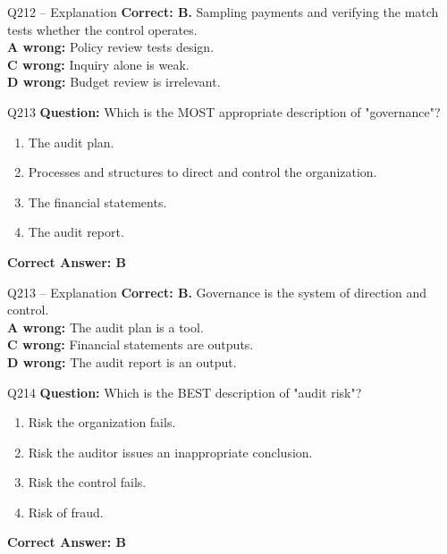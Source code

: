 \documentclass[aspectratio=169,10pt]{beamer}
\begin{document}
	\begin{frame}[t]{Q212 -- Explanation}
		\small
		\textbf{Correct: B.} Sampling payments and verifying the match tests whether the control operates. \\[4pt]
		\textbf{A wrong:} Policy review tests design. \\[2pt]
		\textbf{C wrong:} Inquiry alone is weak. \\[2pt]
		\textbf{D wrong:} Budget review is irrelevant.
	\end{frame}
	
	\begin{frame}[t]{Q213}
		\small
		\textbf{Question:} Which is the MOST appropriate description of "governance"?
		\begin{enumerate}[label=\Alph*.,itemsep=1pt,topsep=2pt]
			\item The audit plan.
			\item Processes and structures to direct and control the organization.
			\item The financial statements.
			\item The audit report.
		\end{enumerate}
		\vspace{4pt}
		\textbf{Correct Answer: B}
	\end{frame}
	
	\begin{frame}[t]{Q213 -- Explanation}
		\small
		\textbf{Correct: B.} Governance is the system of direction and control. \\[4pt]
		\textbf{A wrong:} The audit plan is a tool. \\[2pt]
		\textbf{C wrong:} Financial statements are outputs. \\[2pt]
		\textbf{D wrong:} The audit report is an output.
	\end{frame}
	
	\begin{frame}[t]{Q214}
		\small
		\textbf{Question:} Which is the BEST description of "audit risk"?
		\begin{enumerate}[label=\Alph*.,itemsep=1pt,topsep=2pt]
			\item Risk the organization fails.
			\item Risk the auditor issues an inappropriate conclusion.
			\item Risk the control fails.
			\item Risk of fraud.
		\end{enumerate}
		\vspace{4pt}
		\textbf{Correct Answer: B}
	\end{frame}
	
\end{document}
